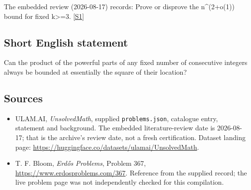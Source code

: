 \documentclass[11pt,a4paper]{article}
\newcommand{\sref}[2]{\hyperlink{source:#1:#2}{[S#2]}}
\begin{document}
The embedded review (2026-08-17) records: Prove or disprove the n\textasciicircum{}(2+o(1)) bound for fixed k>=3. \sref{statement}{1}

\subsection{Short English statement}

Can the product of the powerful parts of any fixed number of consecutive integers always be bounded at essentially the square of their location?

\subsection{Sources}

{\small

\begin{itemize}

\item[\hypertarget{source:statement:1}{S1}] ULAM.AI, \emph{UnsolvedMath}, supplied \texttt{problems.json}, catalogue entry, statement and background. The embedded literature-review date is 2026-08-17; that is the archive’s review date, not a fresh certification. Dataset landing page: \url{https://huggingface.co/datasets/ulamai/UnsolvedMath}.

\item[\hypertarget{source:statement:2}{S2}] T. F. Bloom, \emph{Erdős Problems}, Problem 367, \url{https://www.erdosproblems.com/367}. Reference from the supplied record; the live problem page was not independently checked for this compilation.

\end{itemize}

}

\label{end:statement}
\end{document}
